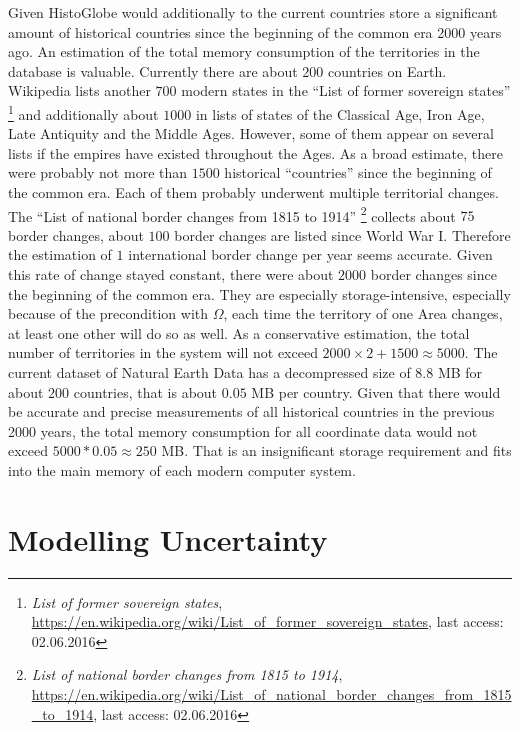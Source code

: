 Given HistoGlobe would additionally to the current countries store a significant amount of historical countries since the beginning of the common era 2000 years ago. An estimation of the total memory consumption of the territories in the database is valuable. Currently there are about $200$ countries on Earth. Wikipedia lists another $700$ modern states in the ``List of former sovereign states''
\footnote{
  \emph{List of former sovereign states},
  \url{https://en.wikipedia.org/wiki/List_of_former_sovereign_states},
  last access: 02.06.2016
}
and additionally about $1000$ in lists of states of the Classical Age, Iron Age, Late Antiquity and the Middle Ages. However, some of them appear on several lists if the empires have existed throughout the Ages. As a broad estimate, there were probably not more than $1500$ historical ``countries'' since the beginning of the common era. Each of them probably underwent multiple territorial changes. The ``List of national border changes from 1815 to 1914''
\footnote{
  \emph{List of national border changes from 1815 to 1914},
  \url{https://en.wikipedia.org/wiki/List_of_national_border_changes_from_1815_to_1914},
  last access: 02.06.2016
}
collects about $75$ border changes, about $100$ border changes are listed since World War I. Therefore the estimation of $1$ international border change per year seems accurate. Given this rate of change stayed constant, there were about $2000$ border changes since the beginning of the common era. They are especially storage-intensive, especially because of the precondition with $\Omega$, each time the territory of one Area changes, at least one other will do so as well. As a conservative estimation, the total number of territories in the system will not exceed $2000 \times 2 + 1500 \approx 5000$. The current dataset of Natural Earth Data has a decompressed size of $8.8$ MB for about $200$ countries, that is about $0.05$ MB per country. Given that there would be accurate and precise measurements of all historical countries in the previous 2000 years, the total memory consumption for all coordinate data would not exceed $5000 * 0.05 \approx 250$ MB. That is an insignificant storage requirement and fits into the main memory of each modern computer system.



\section{Modelling Uncertainty} %
\label{sec:modelling_uncertainty}

